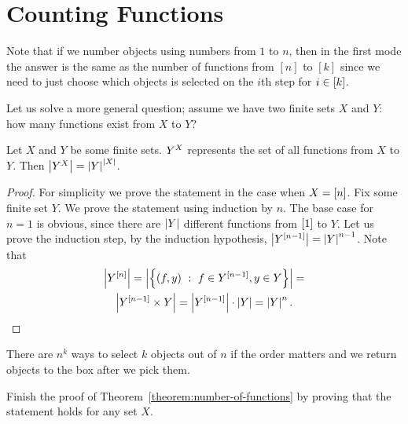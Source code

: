 \section{Counting Functions}
Note that if we number objects using numbers from $1$ to $n$, then in the first
mode the answer is the same as the number of functions from $[n]$ to $[k]$ since
we need to just choose which objects is selected on the $i$th step for
$i \in \range{k}$.

Let us solve a more general question; assume we have two finite sets $X$ and
$Y$: how many functions exist from $X$ to $Y$?


\begin{theorem}
\label{theorem:number-of-functions}
  Let $X$ and $Y$ be some finite sets. $\functions{X}{Y}$ represents the set of all
  functions from $X$ to $Y$. Then $\cardinality{\functions{X}{Y}} =
  \cardinality{Y}^{\cardinality{X}}$.
\end{theorem}
\begin{proof}
  For simplicity we prove the statement in the case when $X = \range{n}$. Fix some
  finite set $Y$. We prove the statement using induction by $n$. The base case
  for $n = 1$ is obvious, since there are $\cardinality{Y}$ different functions
  from $\range{1}$ to $Y$. Let us prove the induction step, by the induction
  hypothesis, $\cardinality{\functions{\range{n - 1}}{Y}} = 
  \cardinality{Y}^{n - 1}$. Note that
  \begin{multline*}
    \cardinality{\functions{\range{n}}{Y}} = 
      \cardinality{\set[f \in Y^{[ n - 1]}, y \in Y]{(f, y)}} = \\
    \cardinality{\functions{\range{n - 1}}{Y} \times Y} = 
      \cardinality{\functions{\range{n - 1}}{Y}} \cdot \cardinality{Y} =
      \cardinality{Y}^n.
  \end{multline*}
\end{proof}

\begin{corollary}
  There are $n^k$ ways to select $k$ objects out of $n$ if the order matters
  and we return objects to the box after we pick them.
\end{corollary}

\begin{exercise}
  Finish the proof of Theorem~\ref{theorem:number-of-functions} by proving that
  the statement holds for any set $X$.
\end{exercise}

